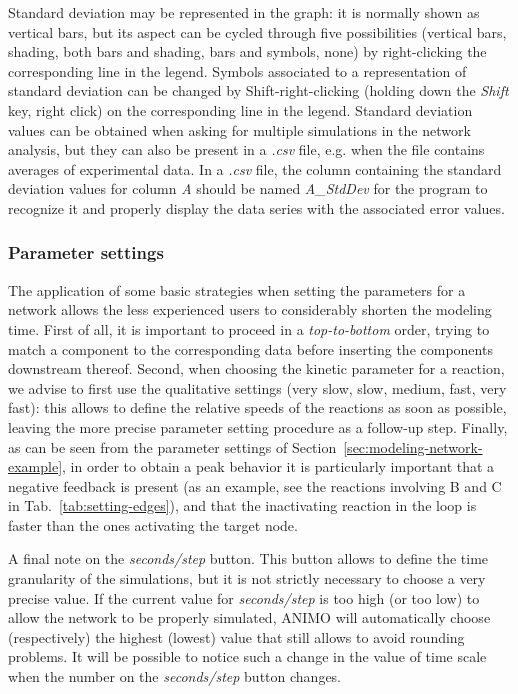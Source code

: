 Standard deviation may be represented in the graph: it is normally shown as vertical bars, but its aspect can be
cycled through five possibilities (vertical bars, shading, both bars and shading, bars and symbols, none) by right-clicking the
corresponding line in the legend. Symbols associated to a representation of standard deviation can be changed by Shift-right-clicking
(holding down the \emph{Shift} key, right click) on the corresponding line in the legend.
Standard deviation values can be obtained when asking for multiple simulations in the network
analysis, but they can also be present in a \emph{.csv} file, e.g. when the file contains averages of experimental data.
In a \emph{.csv} file, the column containing the standard deviation values for column \emph{A}
should be named \emph{A\_{}StdDev} for the program to recognize it and properly display the data series
with the associated error values.



\subsubsection{Parameter settings}
The application of some basic strategies when setting the parameters for a network allows
the less experienced users to considerably shorten the modeling time.
First of all, it is important to proceed in a \emph{top-to-bottom} order, trying to match
a component to the corresponding data before inserting the components downstream thereof.
Second, when choosing the kinetic parameter for a reaction, we advise to first use the qualitative settings (very slow, slow, medium, fast, very fast):
this allows to define the relative speeds of the reactions as soon as possible,
leaving the more precise parameter setting procedure as a follow-up step. Finally, as can be seen from
the parameter settings of Section~\ref{sec:modeling-network-example}, in order to obtain a peak
behavior it is particularly important that
a negative feedback is present (as an example, see the reactions involving B and C in Tab.~\ref{tab:setting-edges}),
and that the inactivating reaction in the loop is faster than the ones activating the target node.

A final note on the \emph{seconds/step} button. This button allows to define the time granularity
of the simulations, but it is not strictly necessary to choose a very precise value.
If the current value for \emph{seconds/step}
is too high (or too low) to allow the network to be properly simulated, ANIMO will automatically choose (respectively)
the highest (lowest) value that still allows to avoid rounding problems. It will be possible to notice
such a change in the value of time scale when the number on the \emph{seconds/step} button changes.


